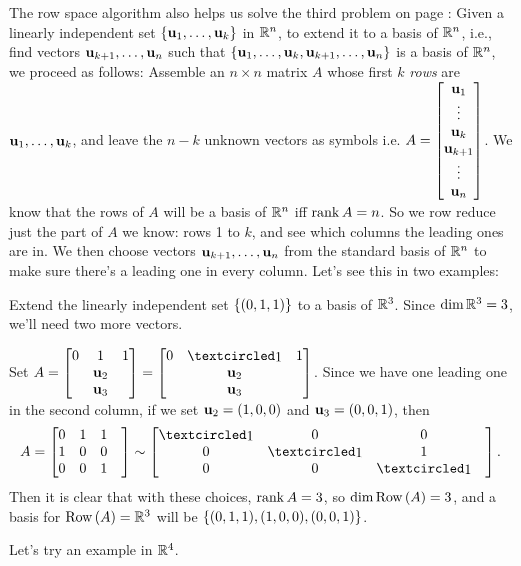 The row space algorithm also helps us solve the third problem on page \pageref{FindingBases}: Given a linearly independent set $\{\mathbf{u}_1,\dots, \mathbf{u}_k  \}$ in $\mathbb{R}^n$,  to extend it to a basis of $\mathbb{R}^n$, i.e., find vectors $\mathbf{u}_{k+1}, \dots, \mathbf{u}_n$ such that $\{\mathbf{u}_1, \dots ,\mathbf{u}_k, \mathbf{u}_{k+1}, \dots, \mathbf{u}_n  \}$ is a basis of $\mathbb{R}^n$, we proceed as follows: Assemble an $n \times n$ matrix $A$ whose first $k$ {\it rows} are $\mathbf{u}_1,\dots, \mathbf{u}_k $, and leave the $n-k$ unknown vectors as symbols i.e. $A=\left[ \begin{matrix} \mathbf{u}_1\\ \vdots \\\mathbf{u}_k \\\mathbf{u}_{k+1} \\\vdots \\\mathbf{u}_n \end{matrix} \right]$. We know that the rows of $A$ will be a basis of $\mathbb{R}^n$ iff $\operatorname{rank} A=n$. So we row reduce just the part of $A$ we know: rows 1 to $k$, and see which columns the leading ones are in. We then choose  vectors $\mathbf{u}_{k+1}, \dots, \mathbf{u}_n$ from the standard basis of $\mathbb{R}^n$ to make sure there's a leading one in every column. Let's see this in two examples:

\begin{myexample} Extend the linearly independent set $\{(0,1,1) \}$ to a basis of $\mathbb{R}^3$. Since $\dim \mathbb{R}^3=3$, we'll need two more vectors.

Set $A=\mat{0&1&1\\&\uu_2&\\&\uu_3&}=\mat{0&\pivot&1\\&\uu_2&\\&\uu_3&}$. Since we have one leading one in the second column, if we set $\mathbf{u}_2=(1,0,0)$ and $\mathbf{u}_3=(0,0,1)$, then
$$A=\mat{0&1&1\\1&0&0\\0&0&1&}\sim \mat{\pivot&0&0\\0&\pivot&1\\0&0&\pivot&}. $$ Then it is clear that with these choices, $\operatorname{rank} A=3$, so $\dim \operatorname{Row\,}(A)=3$, and a basis for $\operatorname{Row\,}(A)=\mathbb{R}^3$ will be $\{(0,1,1),(1,0,0),(0,0,1)  \}$.

\end{myexample}

Let's try an example in $\mathbb{R}^4$.

